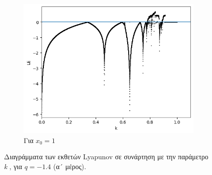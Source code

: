 \begin{figure}[ht]
\begin{subfigure}[b]{0.7\textwidth}
		\includegraphics[width=\textwidth]{LateX images/graphs q16/g9}
		\caption{Για \(x_0=1\)}
		\label{f:g35}
	\end{subfigure}
	
	\caption{Διαγράμματα των εκθετών Lyapunov σε συνάρτηση με την παράμετρο \emph{k} , για  $q=-1.4$ (α´ μέρος).}
\end{figure}

